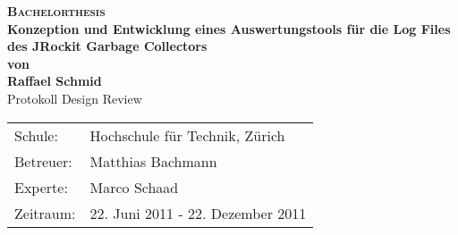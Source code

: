 \begin{titlepage}
\begin{center}
\textsc{\Huge \bf Bachelorthesis}\\[0.4cm]
\LARGE \textbf{Konzeption und Entwicklung eines Auswertungstools für die Log Files des JRockit Garbage Collectors}\\[1.0cm]
\large \textbf{von}\\[0.5cm]
\large \textbf{Raffael Schmid}\\[3cm]
\LARGE Protokoll Design Review\\
\vspace{7cm}

\end{center}

\begin{tabular}[ht]{ll}
  Schule: & Hochschule für Technik, Zürich\\
  Betreuer: & Matthias Bachmann\\
  Experte: & Marco Schaad \\
  Zeitraum: & 22. Juni 2011 - 22. Dezember 2011
\end{tabular}
\end{titlepage}
